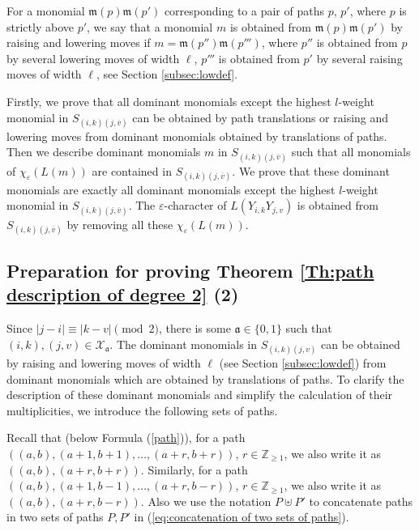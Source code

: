\documentclass[12pt, reqno]{amsart}
\numberwithin{equation}{section}
\newcommand{\ZZ}{\mathbb{Z}}
\begin{document}
{For a monomial $\mathfrak{m}(p)\mathfrak{m}(p')$ corresponding to a pair of paths $p$, $p'$, where $p$ is strictly above $p'$, we say that a monomial $m$ is obtained from $\mathfrak{m}(p)\mathfrak{m}(p')$ by raising and lowering moves if $m=\mathfrak{m}(p'')\mathfrak{m}(p''')$, where $p''$ is obtained from $p$ by several lowering moves of width $\ell$, $p'''$ is obtained from $p'$ by several raising moves of width $\ell$, see Section \ref{subsec:lowdef}.

Firstly, we prove that all dominant monomials except the highest $l$-weight monomial in $S_{(i, k)(j, \overline{v})}$ can be obtained by path translations or raising and lowering moves from dominant monomials obtained by translations of paths. Then we describe dominant monomials $m$ in $S_{(i, k)(j, \overline{v})}$ such that all monomials of $\chi_{\varepsilon}(L(m))$ are contained in $S_{(i, k)(j, \overline{v})}$. We prove that these dominant monomials are exactly all dominant monomials except the highest $l$-weight monomial in $S_{(i, k)(j, \overline{v})}$. The $\varepsilon$-character of $L(Y_{i,k}Y_{j,v})$ is obtained from $S_{(i, k)(j, \overline{v})}$ by removing all these $\chi_{\varepsilon}(L(m))$.


\subsection{Preparation for proving Theorem \ref{Th:path description of degree 2} (2)}
Since $|j-i| \equiv |k-v| \pmod {2}$, there is some $\mathfrak{a} \in \{0,1\}$ such that $(i,k),(j,v)\in \mathcal{X}_{\mathfrak{a}}$. The dominant monomials in $S_{(i, k)(j, v)}$ can be obtained by raising and lowering moves of width $\ell$ (see Section \ref{subsec:lowdef}) from dominant monomials which are obtained by translations of paths. To clarify the description of these dominant monomials and simplify the calculation of their multiplicities, we introduce the following sets of paths.  

Recall that (below Formula (\ref{path})), for a path $((a, b), (a+1, b+1), \ldots, (a+r, b+r))$, $r \in \ZZ_{\ge 1}$, we also write it as $((a, b), (a+r, b+r))$. Similarly, for a path $((a, b), (a+1, b-1), \ldots, (a+r, b-r))$, $r \in \ZZ_{\ge 1}$, we also write it as $((a, b), (a+r, b-r))$. Also we use the notation $P \uplus P'$ to concatenate paths in two sets of paths $P, P'$ in (\ref{eq:concatenation of two sets of paths}). 

}
\end{document}
